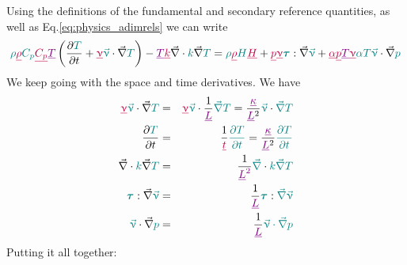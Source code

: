 \documentclass[a4paper,11pt]{article}
\newcommand{\nn}{\nonumber}
\begin{document}
Using the definitions of the fundamental and secondary reference quantities, as well as 
Eq.\eqref{eq:physics_adimrels} we can write
\[
{\color{teal} \rho} {\color{purple} \underline{\rho}}
{\color{teal} C_p} {\color{purple} \underline{C_p}} {\color{violet} \underline{T}}
\left(\frac{\partial {\color{teal} T} }{\partial t} + 
{\color{purple} \underline{\upnu}} {\color{teal} \vec\upnu}
\cdot\vec\nabla {\color{teal} T}  \right)
- {\color{violet} \underline{T}} {\color{purple} \underline{k}} 
\vec\nabla\cdot {\color{teal} k} \vec\nabla {\color{teal}T} 
= {\color{teal} \rho} {\color{purple} \underline{\rho}}
{\color{teal} H} {\color{purple} \underline{H}}
+ {\color{purple} \underline{p}} {\color{purple} \underline{\upnu}}
{\color{teal} {\bm \tau}}:
\vec\nabla   {\color{teal} \vec\upnu}
+
{\color{purple} \underline{\alpha}}
{\color{purple} \underline{p}}
{\color{violet} \underline{T}}
{\color{purple} \underline{\upnu}}
{\color{teal} \alpha} 
{\color{teal} T} 
{\color{teal} \vec\upnu} \cdot \vec\nabla {\color{teal} p} 
\]
We keep going with the space and time derivatives.
We have
\begin{eqnarray}
{\color{purple} \underline{\upnu}} {\color{teal} \vec\upnu} \cdot\vec\nabla {\color{teal} T}  
&=&
{\color{purple} \underline{\upnu}} {\color{teal} \vec\upnu} \cdot 
\frac{1}{\color{violet} \underline{L}}{\color{teal}\vec\nabla }{\color{teal} T}  
=\frac{ {\color{violet} \underline{\kappa}}}{ {\color{violet} \underline{L}}^2 }
 {\color{teal} \vec\upnu} \cdot {\color{teal}\vec\nabla }{\color{teal} T}  
\nn\\
\frac{\partial {\color{teal} T} }{\partial t} 
&=& \frac{1}{ \color{purple} \underline{t}} {\color{teal} \frac{\partial T}{\partial t} }
= \frac{ {\color{violet} \underline{\kappa}}}{ {\color{violet} \underline{L}}^2 }
{\color{teal} \frac{\partial T}{\partial t} }
\nn\\
\vec\nabla \cdot {\color{teal} k} \vec\nabla {\color{teal}T} 
&=&
\frac{1}{\color{violet} \underline{L}^2}
{\color{teal}\vec\nabla } \cdot {\color{teal} k \vec\nabla T} 
\nn
\\
{\color{teal} {\bm \tau}}: \vec\nabla   {\color{teal} \vec\upnu} &=& 
\frac{1}{\color{violet} \underline{L}}
{\color{teal} {\bm \tau}}: {\color{teal}\vec\nabla \vec\upnu   }
\nn\\
{\color{teal} \vec\upnu} \cdot \vec\nabla {\color{teal} p} 
&=&
\frac{1}{\color{violet} \underline{L}}
{\color{teal} \vec\upnu \cdot \vec\nabla  p} 
\end{eqnarray}
Putting it all together:
\end{document}
